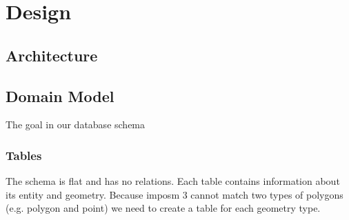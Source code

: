 \chapter{Design}\label{design}


\section{Architecture}\label{architecture}



\section{Domain Model}\label{domain-model}

The goal in our database schema 

\subsection{Tables}

The schema is flat and has no relations. Each table contains
information about its entity and geometry. Because imposm 3
cannot match two types of polygons (e.g. polygon and point) we need
to create a table for each geometry type.

